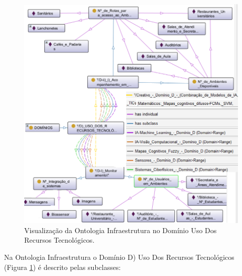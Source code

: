 \documentclass[portuguese]{textolivre}
\begin{document}
\begin{figure}[h!]
    \centering
    \includegraphics[width=0.90\linewidth]{images/FIGURA8.png}
    \caption{Visualização da Ontologia Infraestrutura no Domínio Uso Dos Recursos Tecnológicos.}
    \label{fig-8}
\end{figure}
\bigskip
Na Ontologia Infraestrutura o Domínio D) Uso Dos Recursos Tecnológicos (Figura \ref{fig-8}) é descrito pelas subclasses:
\end{document}
